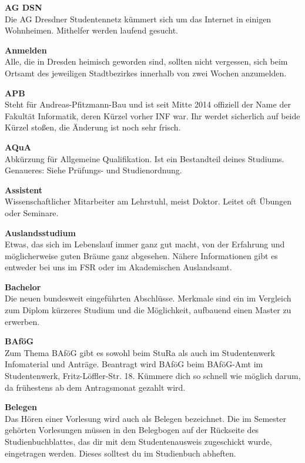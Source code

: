 \twocolumn


\textbf{AG DSN} \\
Die AG Dresdner Studentennetz kümmert sich um das Internet in einigen Wohnheimen.
Mithelfer werden laufend gesucht.

\textbf{Anmelden} \\
Alle, die in Dresden heimisch geworden sind, sollten nicht vergessen, sich beim Ortsamt des jeweiligen Stadtbezirkes innerhalb von zwei Wochen anzumelden.

\textbf{APB} \\
Steht für Andreas-Pfitzmann-Bau und ist seit Mitte 2014 offiziell der Name der Fakultät Informatik, deren Kürzel vorher INF war. Ihr werdet sicherlich auf beide Kürzel stoßen, die Änderung ist noch sehr frisch.

\textbf{AQuA} \\
Abkürzung für Allgemeine Qualifikation.
Ist ein Bestandteil deines Studiums.
Genaueres:
Siehe Prüfungs- und Studienordnung.

\textbf{Assistent} \\
Wissenschaftlicher Mitarbeiter am Lehrstuhl, meist Doktor.
Leitet oft Übungen oder Seminare.

\textbf{Auslandsstudium} \\
Etwas, das sich im Lebenslauf immer ganz gut macht, von der Erfahrung und möglicherweise guten Bräune ganz abgesehen.
Nähere Informationen gibt es entweder bei uns im FSR oder im Akademischen Auslandsamt.

\textbf{Bachelor} \\
Die neuen bundesweit eingeführten Abschlüsse.
Merkmale sind ein im Vergleich zum Diplom kürzeres Studium und die Möglichkeit, aufbauend einen Master zu erwerben.

\textbf{BAföG} \\
Zum Thema BAföG gibt es sowohl beim StuRa als auch im Studentenwerk Infomaterial und Anträge.
Beantragt wird BAföG beim BAföG-Amt im Studentenwerk, Fritz-Löffler-Str. 18.
Kümmere dich so schnell wie möglich darum, da frühestens ab dem Antragsmonat gezahlt wird.

\textbf{Belegen} \\
Das Hören einer Vorlesung wird auch als Belegen bezeichnet.
Die im Semester gehörten Vorlesungen müssen in den Belegbogen auf der Rückseite des Studienbuchblattes, das dir mit dem Studentenausweis zugeschickt wurde, eingetragen werden.
Dieses solltest du im Studienbuch abheften.

